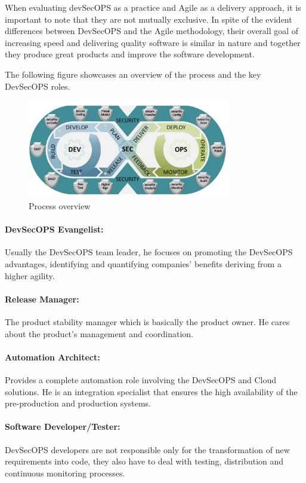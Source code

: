 When evaluating devSecOPS as a practice and Agile as a delivery approach, it is important to note that they are not mutually exclusive. In spite of the evident differences between DevSecOPS and the Agile methodology, their overall goal of increasing speed and delivering quality software is similar in nature and together they produce great products and improve the software development. 

The following figure showcases an overview of the process and the key DevSecOPS roles. 

\begin{figure}[!ht]\centering
\includegraphics[width=0.8\textwidth,angle=00]{assets/f1.png}
\caption{Process overview}
\label{fig:processOverview}
\end{figure}


\paragraph{DevSecOPS Evangelist:} 
Usually the DevSecOPS team leader, he focuses on promoting the DevSecOPS advantages, identifying and quantifying companies’ benefits deriving from a higher agility. 

\paragraph{Release Manager:} 
The product stability manager which is basically the product owner. He cares about the product’s management and coordination. 

\paragraph{Automation Architect: }
Provides a complete automation role involving the DevSecOPS and Cloud solutions. He is an integration specialist that ensures the high availability of the pre-production and production systems. 

\paragraph{Software Developer/Tester:}
DevSecOPS developers are not responsible only for the transformation of new requirements into code, they also have to deal with testing, distribution and continuous monitoring processes.


